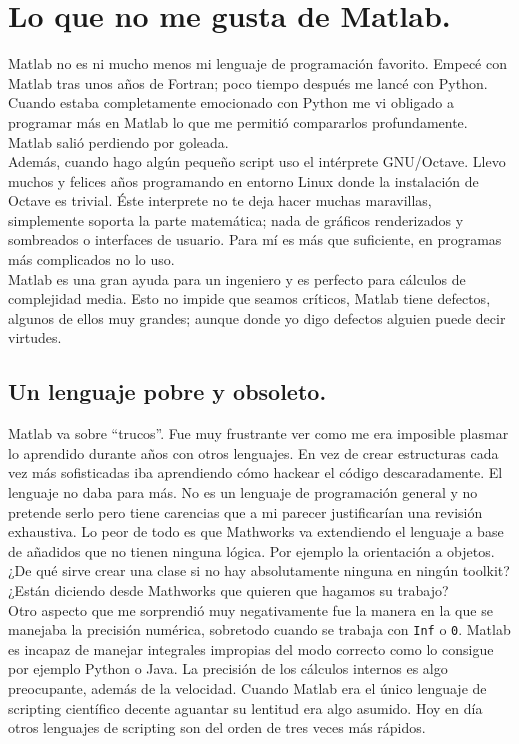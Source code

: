 \chapter{Lo que no me gusta de Matlab.}

Matlab no es ni mucho menos mi lenguaje de programación favorito.
Empecé con Matlab tras unos años de Fortran; poco tiempo después me
lancé con Python. Cuando estaba completamente emocionado con Python
me vi obligado a programar más en Matlab lo que me permitió compararlos
profundamente. Matlab salió perdiendo por goleada.\\

Además, cuando hago algún pequeño script uso el intérprete GNU/Octave.
Llevo muchos y felices años programando en entorno Linux donde la
instalación de Octave es trivial. Éste interprete no te deja hacer
muchas maravillas, simplemente soporta la parte matemática; nada de
gráficos renderizados y sombreados o interfaces de usuario. Para mí
es más que suficiente, en programas más complicados no lo uso.\\

Matlab es una gran ayuda para un ingeniero y es perfecto para cálculos
de complejidad media. Esto no impide que seamos críticos, Matlab tiene
defectos, algunos de ellos muy grandes; aunque donde yo digo defectos
alguien puede decir virtudes.


\section{Un lenguaje pobre y obsoleto.}

Matlab va sobre {}``trucos''. Fue muy frustrante ver como me era
imposible plasmar lo aprendido durante años con otros lenguajes. En
vez de crear estructuras cada vez más sofisticadas iba aprendiendo
cómo hackear el código descaradamente. El lenguaje no daba para más.
No es un lenguaje de programación general y no pretende serlo pero
tiene carencias que a mi parecer justificarían una revisión exhaustiva.
Lo peor de todo es que Mathworks va extendiendo el lenguaje a base
de añadidos que no tienen ninguna lógica. Por ejemplo la orientación
a objetos. ¿De qué sirve crear una clase si no hay absolutamente ninguna
en ningún toolkit? ¿Están diciendo desde Mathworks que quieren que
hagamos su trabajo?\\

Otro aspecto que me sorprendió muy negativamente fue la manera en
la que se manejaba la precisión numérica, sobretodo cuando se trabaja
con \texttt{Inf} o \texttt{0}. Matlab es incapaz de manejar integrales
impropias del modo correcto como lo consigue por ejemplo Python o
Java. La precisión de los cálculos internos es algo preocupante, además
de la velocidad. Cuando Matlab era el único lenguaje de scripting
científico decente aguantar su lentitud era algo asumido. Hoy en día
otros lenguajes de scripting son del orden de tres veces más rápidos.\\


